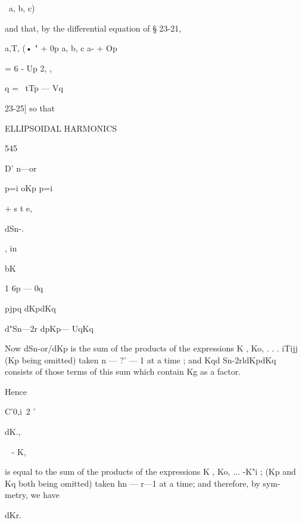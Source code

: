 {\ a, b, c)

and that, by the differential equation of § 23-21,

a,T, (• " + 0p a, b, c a- + Op

= 6 - Up 2, ,

q = \ tTp — Vq



23-25] so that



ELLIPSOIDAL HARMONICS



545



D' n—or



p=i oKp p=i



+ s t e,



dSn-.



, in



bK



1 6p — 0q



pjpq dKpdKq



d"Sn—2r dpKp— UqKq






Now dSn-or/dKp is the sum of the products of the expressions K , Ko, .
. . iTijj (Kp being omitted) taken n — ?' — 1 at a time ; and Kqd
Sn-2rldKpdKq consists of those terms of this sum which contain Kg as a
factor.



Hence



C'0,i\ 2 '



dK.,



~ - K,






is equal to the sum of the products of the expressions K , Ko, ...
-K"i ; (Kp and Kq both being omitted) taken hn — r—1 at a time; and
therefore, by sym- metry, we have



dKr.



}
